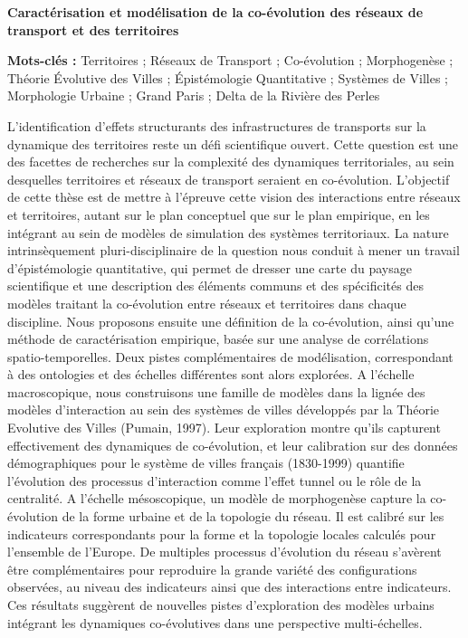 \documentclass[9pt]{article}
\begin{document}


\noindent\textbf{Caractérisation et modélisation de la co-évolution des réseaux de transport et des territoires}

\bigskip

\noindent\textbf{Mots-clés : } Territoires ; Réseaux de Transport ; Co-évolution ; Morphogenèse ; Théorie Évolutive des Villes ; Épistémologie Quantitative ; Systèmes de Villes ; Morphologie Urbaine ; Grand Paris ; Delta de la Rivière des Perles

\bigskip

\noindent
L'identification d'effets structurants des infrastructures de transports sur la dynamique des territoires reste un défi scientifique ouvert. Cette question est une des facettes de recherches sur la complexité des dynamiques territoriales, au sein desquelles territoires et réseaux de transport seraient en co-évolution. L'objectif de cette thèse est de mettre à l'épreuve cette vision des interactions entre réseaux et territoires, autant sur le plan conceptuel que sur le plan empirique, en les intégrant au sein de modèles de simulation des systèmes territoriaux. La nature intrinsèquement pluri-disciplinaire de la question nous conduit à mener un travail d'épistémologie quantitative, qui permet de dresser une carte du paysage scientifique et une description des éléments communs et des spécificités des modèles traitant la co-évolution entre réseaux et territoires dans chaque discipline. Nous proposons ensuite une définition de la co-évolution, ainsi qu'une méthode de caractérisation empirique, basée sur une analyse de corrélations spatio-temporelles. Deux pistes complémentaires de modélisation, correspondant à des ontologies et des échelles différentes sont alors explorées. A l'échelle macroscopique, nous construisons une famille de modèles dans la lignée des modèles d'interaction au sein des systèmes de villes développés par la Théorie Evolutive des Villes (Pumain, 1997). Leur exploration montre qu'ils capturent effectivement des dynamiques de co-évolution, et leur calibration sur des données démographiques pour le système de villes français (1830-1999) quantifie l'évolution des processus d'interaction comme l'effet tunnel ou le rôle de la centralité. A l'échelle mésoscopique, un modèle de morphogenèse capture la co-évolution de la forme urbaine et de la topologie du réseau. Il est calibré sur les indicateurs correspondants pour la forme et la topologie locales calculés pour l'ensemble de l'Europe. De multiples processus d'évolution du réseau s'avèrent être complémentaires pour reproduire la grande variété des configurations observées, au niveau des indicateurs ainsi que des interactions entre indicateurs. Ces résultats suggèrent de nouvelles pistes d'exploration des modèles urbains intégrant les dynamiques co-évolutives dans une perspective multi-échelles.
\end{document}
